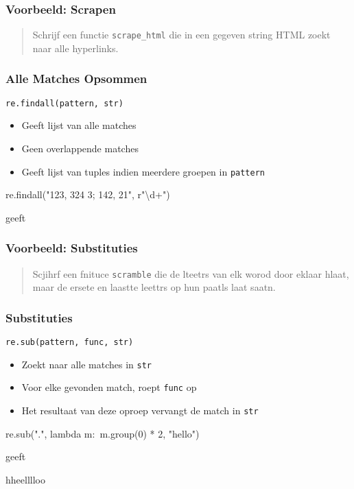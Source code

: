 \begin{frame}
  \frametitle{Voorbeeld: Scrapen}
  \begin{quote}
    Schrijf een functie \texttt{scrape\_html} die in een gegeven string HTML
    zoekt naar alle hyperlinks.
  \end{quote}
\end{frame}

\begin{frame}
  \frametitle{Alle Matches Opsommen}
  \begin{center}
    \texttt{re.findall(pattern, str)}
  \end{center}
  \begin{itemize}
    \item Geeft lijst van alle matches
    \item Geen overlappende matches
    \item Geeft lijst van tuples indien meerdere groepen in \texttt{pattern}
  \end{itemize}
  \vskip5mm
  \begin{center} \ttfamily
    re.findall("123, 324 3; 142, 21", r"\textbackslash d+")
  \end{center}
  geeft
  \begin{center} \ttfamily
    [ "123", "324", "3", "142", "21" ]
  \end{center}
\end{frame}

\begin{frame}
  \frametitle{Voorbeeld: Substituties}
  \begin{quote}
    Scjihrf een fnituce	\texttt{scramble} die de
    lteetrs van elk worod door eklaar hlaat, maar de ersete
    en laastte leettrs op hun paatls laat saatn.
  \end{quote}
\end{frame}

\begin{frame}
  \frametitle{Substituties}
  \begin{center}
    \texttt{re.sub(pattern, func, str)}
  \end{center}
  \begin{itemize}
    \item Zoekt naar alle matches in \texttt{str}
    \item Voor elke gevonden match, roept \texttt{func} op
    \item Het resultaat van deze oproep vervangt de match in \texttt{str}
  \end{itemize}
  \vskip5mm
  \begin{center} \ttfamily
    re.sub(".", lambda m:\ m.group(0) * 2, "hello")
  \end{center}
  geeft
  \begin{center} \ttfamily
    hheelllloo
  \end{center}
\end{frame}



